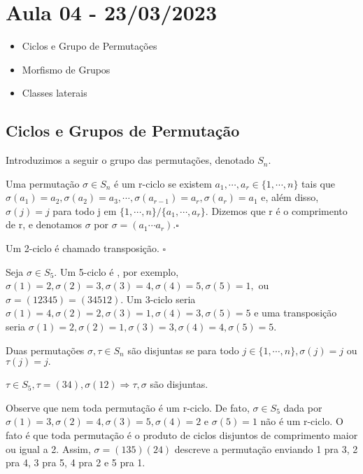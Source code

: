 \documentclass[algebra_notes.tex]{subfiles}
\begin{document}
\section{Aula 04 - 23/03/2023}
\begin{itemize}
	\item Ciclos e Grupo de Permutações
	\item Morfismo de Grupos
	\item Classes laterais
\end{itemize}
\subsection{Ciclos e Grupos de Permutação}
Introduzimos a seguir o grupo das permutações, denotado $S_{n}.$
\begin{def*}
	Uma permutação $\sigma\in S_{n}$ é um r-ciclo se existem $a_{1},\cdots, a_{r}\in\{1,\cdots, n\}$ tais que $\sigma(a_{1})=a_{2},
		\sigma(a_{2})=a_{3}, \cdots, \sigma(a_{r-1})=a_{r}, \sigma(a_{r}) = a_{1}$ e, além disso, $\sigma(j) = j$ para todo j em $\{1,\cdots, n\}/\{a_{1},\cdots,a_{r}\}$.
	Dizemos que r é o comprimento de r, e denotamos $\sigma$ por $\sigma=(a_{1}\cdots a_{r}).\square$
\end{def*}
\begin{def*}
	Um 2-ciclo é chamado transposição. $\square$
\end{def*}
\begin{example*}
	Seja $\sigma\in S_{5}.$ Um 5-ciclo é , por exemplo, $\sigma(1)=2, \sigma(2)=3, \sigma(3)=4, \sigma(4)=5, \sigma(5)=1,$ ou $\sigma=(12345)=(34512).$
	Um 3-ciclo seria $\sigma(1)=4, \sigma(2)=2, \sigma(3)=1, \sigma(4)=3, \sigma(5)=5$ e uma transposição seria $\sigma(1)=2, \sigma(2)=1, \sigma(3)=3, \sigma(4)=4, \sigma(5)=5.$
\end{example*}
\begin{def*}
	Duas permutações $\sigma, \tau\in S_{n}$ são disjuntas se para todo $j\in\{1, \cdots, n\}, \sigma(j) = j$ ou $\tau(j) = j.$
\end{def*}
\begin{example*}
	$\tau\in S_{5}, \tau=(34), \sigma(12) \Rightarrow \tau, \sigma$ são disjuntas.
\end{example*}
Observe que nem toda permutação é um r-ciclo. De fato, $\sigma\in S_{5}$ dada por $\sigma(1)=3, \sigma(2) = 4, \sigma(3) = 5, \sigma(4) = 2$
e $\sigma(5)=1$ não é um r-ciclo. O fato é que toda permutação é o produto de ciclos disjuntos de comprimento maior ou igual a 2.
Assim, $\sigma = (135)(24)$ descreve a permutação enviando 1 pra 3, 2 pra 4, 3 pra 5, 4 pra 2 e 5 pra 1.
\end{document}
